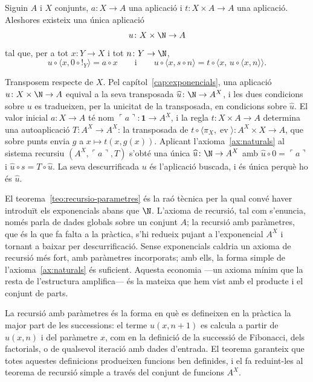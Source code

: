\begin{teorema}\label{teo:recursio-parametres}
Siguin \(A\) i \(X\) conjunts, \(a\colon X\to A\) una aplicació i
\(t\colon X\times A\to A\) una aplicació. Aleshores existeix una única
aplicació
\[
u\colon X\times\N\to A
\]
tal que, per a tot \(x\colon Y\to X\) i tot \(n\colon Y\to\N\),
\[
u\circ\langle x,0\circ{!}_Y\rangle=a\circ x
\qquad\text{i}\qquad
u\circ\langle x,s\circ n\rangle=t\circ\langle x,\,u\circ\langle
x,n\rangle\rangle .
\]
\end{teorema}

\begin{prova}
Transposem respecte de \(X\). Pel capítol~\ref{cap:exponencials}, una
aplicació \(u\colon X\times\N\to A\) equival a la seva transposada
\(\widehat u\colon\N\to A^{X}\), i les dues condicions sobre \(u\) es
tradueixen, per la unicitat de la transposada, en condicions sobre
\(\widehat u\). El valor inicial \(a\colon X\to A\) té nom
\(\ulcorner a\urcorner\colon\mathbf1\to A^{X}\), i la regla
\(t\colon X\times A\to A\) determina una autoaplicació
\(T\colon A^{X}\to A^{X}\): la transposada de
\(t\circ\langle\pi_X,\operatorname{ev}\rangle\colon A^X\times X\to A\),
que sobre punts envia \(g\) a \(x\mapsto t(x,g(x))\). Aplicant
l'axioma~\ref{ax:naturals} al sistema recursiu
\((A^{X},\ulcorner a\urcorner,T)\) s'obté una única
\(\widehat u\colon\N\to A^{X}\) amb
\(\widehat u\circ 0=\ulcorner a\urcorner\) i
\(\widehat u\circ s=T\circ\widehat u\). La seva descurrificada \(u\) és
l'aplicació buscada, i és única perquè ho és \(\widehat u\).
\end{prova}

\begin{observacio}\label{obs:exponencials-recursio}
El teorema~\ref{teo:recursio-parametres} és la raó tècnica per la qual
convé haver introduït els exponencials abans que \(\N\). L'axioma de
recursió, tal com s'enuncia, només parla de dades globals sobre un
conjunt \(A\); la recursió amb paràmetres, que és la que fa falta a la
pràctica, s'hi redueix pujant a l'exponencial \(A^{X}\) i tornant a baixar
per descurrificació. Sense exponencials caldria un axioma de recursió més
fort, amb paràmetres incorporats; amb ells, la forma simple de
l'axioma~\ref{ax:naturals} és suficient. Aquesta economia ---un axioma
mínim que la resta de l'estructura amplifica--- és la mateixa que hem vist
amb el producte i el conjunt de parts.
\end{observacio}

\begin{observacio}\label{obs:recursio-parametres-classica}
La recursió amb paràmetres és la forma en què es defineixen en la
pràctica la major part de les successions: el terme \(u(x,n+1)\) es calcula
a partir de \(u(x,n)\) i del paràmetre \(x\), com en la definició de la
successió de Fibonacci, dels factorials, o de qualsevol iteració amb dades
d'entrada. El teorema garanteix que totes aquestes definicions produeixen
funcions ben definides, i el fa reduint-les al teorema de recursió simple
a través del conjunt de funcions \(A^{X}\).
\end{observacio}

